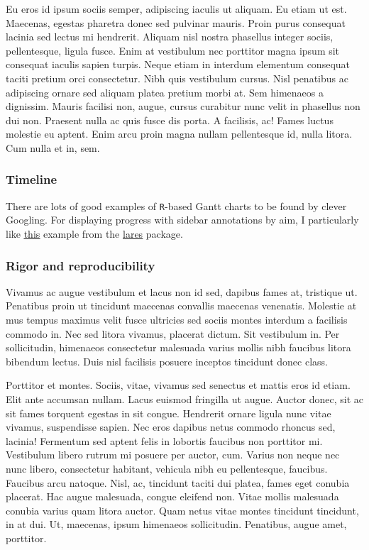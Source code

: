 \documentclass[11pt,]{article}
\begin{document}
Eu eros id ipsum sociis semper, adipiscing iaculis ut aliquam. Eu etiam
ut est. Maecenas, egestas pharetra donec sed pulvinar mauris. Proin
purus consequat lacinia sed lectus mi hendrerit. Aliquam nisl nostra
phasellus integer sociis, pellentesque, ligula fusce. Enim at vestibulum
nec porttitor magna ipsum sit consequat iaculis sapien turpis. Neque
etiam in interdum elementum consequat taciti pretium orci consectetur.
Nibh quis vestibulum cursus. Nisl penatibus ac adipiscing ornare sed
aliquam platea pretium morbi at. Sem himenaeos a dignissim. Mauris
facilisi non, augue, cursus curabitur nunc velit in phasellus non dui
non. Praesent nulla ac quis fusce dis porta. A facilisis, ac! Fames
luctus molestie eu aptent. Enim arcu proin magna nullam pellentesque id,
nulla litora. Cum nulla et in, sem.

\hypertarget{timeline}{%
\subsubsection{Timeline}\label{timeline}}

There are lots of good examples of \texttt{R}-based Gantt charts to be
found by clever Googling. For displaying progress with sidebar
annotations by aim, I particularly like
\href{https://datascienceplus.com/visualize-your-cvs-timeline-with-r-gantt-style/}{\underline{this}}
example from the
\href{https://github.com/laresbernardo/lares}{\underline{lares}}
package.

\hypertarget{rigor-and-reproducibility}{%
\subsubsection{Rigor and
reproducibility}\label{rigor-and-reproducibility}}

Vivamus ac augue vestibulum et lacus non id sed, dapibus fames at,
tristique ut. Penatibus proin ut tincidunt maecenas convallis maecenas
venenatis. Molestie at mus tempus maximus velit fusce ultricies sed
sociis montes interdum a facilisis commodo in. Nec sed litora vivamus,
placerat dictum. Sit vestibulum in. Per sollicitudin, himenaeos
consectetur malesuada varius mollis nibh faucibus litora bibendum
lectus. Duis nisl facilisis posuere inceptos tincidunt donec class.

Porttitor et montes. Sociis, vitae, vivamus sed senectus et mattis eros
id etiam. Elit ante accumsan nullam. Lacus euismod fringilla ut augue.
Auctor donec, sit ac sit fames torquent egestas in sit congue. Hendrerit
ornare ligula nunc vitae vivamus, suspendisse sapien. Nec eros dapibus
netus commodo rhoncus sed, lacinia! Fermentum sed aptent felis in
lobortis faucibus non porttitor mi. Vestibulum libero rutrum mi posuere
per auctor, cum. Varius non neque nec nunc libero, consectetur habitant,
vehicula nibh eu pellentesque, faucibus. Faucibus arcu natoque. Nisl,
ac, tincidunt taciti dui platea, fames eget conubia placerat. Hac augue
malesuada, congue eleifend non. Vitae mollis malesuada conubia varius
quam litora auctor. Quam netus vitae montes tincidunt tincidunt, in at
dui. Ut, maecenas, ipsum himenaeos sollicitudin. Penatibus, augue amet,
porttitor.
\end{document}
